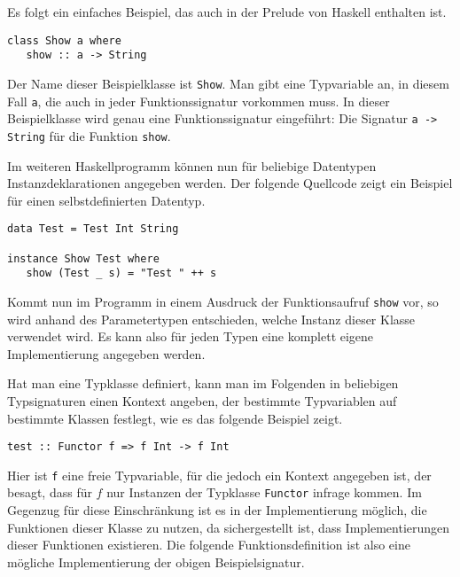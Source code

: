 Es folgt ein einfaches Beispiel, das auch in der Prelude von Haskell enthalten ist.


\begin{verbatim}
class Show a where
   show :: a -> String
\end{verbatim}

Der Name dieser Beispielklasse ist \texttt{Show}. Man gibt eine Typvariable an, in diesem Fall \texttt{a}, die auch in jeder
Funktionssignatur vorkommen muss. In dieser Beispielklasse wird genau eine Funktionssignatur eingeführt: Die Signatur
\texttt{a -> String} für die Funktion \texttt{show}.

Im weiteren Haskellprogramm können nun für beliebige Datentypen Instanzdeklarationen angegeben werden. Der folgende
Quellcode zeigt ein Beispiel für einen selbstdefinierten Datentyp.

\begin{verbatim}
data Test = Test Int String

instance Show Test where
   show (Test _ s) = "Test " ++ s
\end{verbatim}

Kommt nun im Programm in einem Ausdruck der Funktionsaufruf \texttt{show} vor, so wird anhand des Parametertypen
entschieden, welche Instanz dieser Klasse verwendet wird. Es kann also für jeden Typen eine komplett eigene Implementierung
angegeben werden.

Hat man eine Typklasse definiert, kann man im Folgenden in beliebigen Typsignaturen einen Kontext angeben, der
bestimmte Typvariablen auf bestimmte Klassen festlegt, wie es das folgende Beispiel zeigt.

\begin{verbatim}
test :: Functor f => f Int -> f Int
\end{verbatim}

Hier ist \texttt{f} eine freie Typvariable, für die jedoch ein Kontext angegeben ist, der besagt, dass für $f$ nur Instanzen
der Typklasse \texttt{Functor} infrage kommen. Im Gegenzug für diese Einschränkung ist es in der Implementierung möglich,
die Funktionen dieser Klasse zu nutzen, da sichergestellt ist, dass Implementierungen dieser Funktionen
existieren. Die folgende Funktionsdefinition ist also eine mögliche Implementierung der obigen Beispielsignatur.

